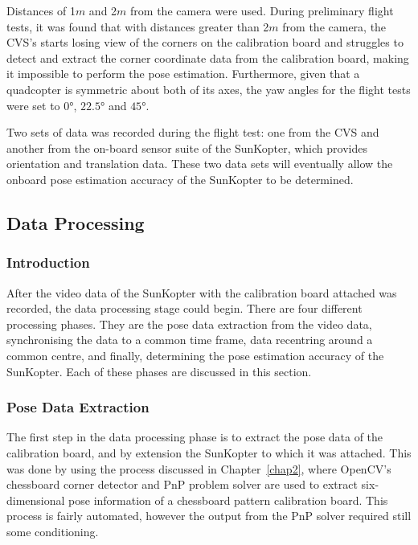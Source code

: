 Distances of 1$m$ and 2$m$ from the camera were used. During preliminary flight tests, it was found that with distances greater than 2$m$ from the camera, the CVS's starts losing view of the corners on the calibration board and struggles to detect and extract the corner coordinate data from the calibration board, making it impossible to perform the pose estimation. Furthermore, given that a quadcopter is symmetric about both of its axes, the yaw angles for the flight tests were set to $\ang{0}$, $\ang{22.5}$ and $\ang{45}$. 

Two sets of data was recorded during the flight test: one from the CVS and another from the on-board sensor suite of the SunKopter, which provides orientation and translation data. These two data sets will eventually allow the onboard pose estimation accuracy of the SunKopter to be determined. 

\subsection{Data Processing}

\subsubsection{Introduction}

After the video data of the SunKopter with the calibration board attached was recorded, the data processing stage could begin. There are four different processing phases. They are the pose data extraction from the video data, synchronising the data to a common time frame, data recentring around a common centre, and finally, determining the pose estimation accuracy of the SunKopter. Each of these phases are discussed in this section. 

\subsubsection{Pose Data Extraction}

The first step in the data processing phase is to extract the pose data of the calibration board, and by extension the SunKopter to which it was attached. This was done by using the process discussed in Chapter~\ref{chap2}, where OpenCV's chessboard corner detector and PnP problem solver are used to extract six-dimensional pose information of a chessboard pattern calibration board. This process is fairly automated, however the output from the PnP solver required still some conditioning.

